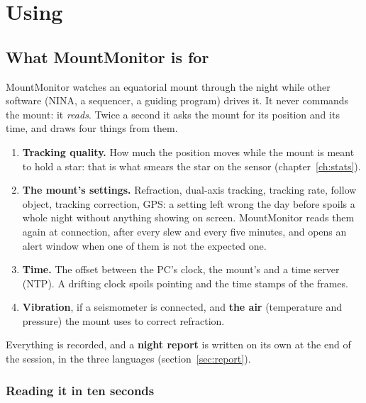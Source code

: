 \part{Using}

\chapter{What MountMonitor is for}
\label{ch:purpose}

MountMonitor watches an equatorial mount through the night while other
software (NINA, a sequencer, a guiding program) drives it. It never commands
the mount: it \emph{reads}. Twice a second it asks the mount for its position
and its time, and draws four things from them.

\begin{enumerate}
  \item \textbf{Tracking quality.} How much the position moves while the mount
  is meant to hold a star: that is what smears the star on the sensor
  (chapter~\ref{ch:stats}).
  \item \textbf{The mount's settings.} Refraction, dual-axis tracking, tracking
  rate, follow object, tracking correction, GPS: a setting left wrong the day
  before spoils a whole night without anything showing on screen. MountMonitor
  reads them again at connection, after every slew and every five minutes, and
  opens an alert window when one of them is not the expected one.
  \item \textbf{Time.} The offset between the PC's clock, the mount's and a time
  server (NTP). A drifting clock spoils pointing and the time stamps of the
  frames.
  \item \textbf{Vibration}, if a seismometer is connected, and \textbf{the air}
  (temperature and pressure) the mount uses to correct refraction.
\end{enumerate}

Everything is recorded, and a \textbf{night report} is written on its own at
the end of the session, in the three languages (section~\ref{sec:report}).

\section{Reading it in ten seconds}

